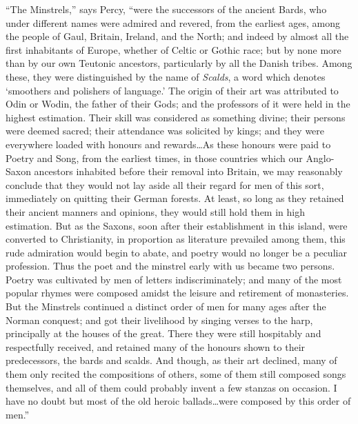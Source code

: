“The Minstrels,” says Percy, “were the successors of the ancient Bards, who
under different names were admired and revered, from the earliest ages, among
the people of Gaul, Britain, Ireland, and the North; and indeed by almost all
the first inhabitants of Europe, whether of Celtic or Gothic race; but by none
more than by our own Teutonic ancestors, particularly by all the Danish tribes.
Among these, they were distinguished by the name of \textit{Scalds}, a word which
denotes ‘smoothers and polishers of language.’ The origin of their art was
attributed to Odin or Wodin, the father of their Gods; and the professors of it
were held in the highest estimation. Their skill was considered as something
divine; their persons were deemed sacred; their attendance was solicited by kings;
and they were everywhere loaded with honours and rewards\ldots As these
honours were paid to Poetry and Song, from the earliest times, in those countries
which our Anglo-Saxon ancestors inhabited before their removal into Britain, we
may reasonably conclude that they would not lay aside all their regard for men
of this sort, immediately on quitting their German forests. At least, so long as
they retained their ancient manners and opinions, they would still hold them in
high estimation. But as the Saxons, soon after their establishment in this
island, were converted to Christianity, in proportion as literature prevailed among 
them, this rude admiration would begin to
\pagebreak
abate, and poetry would no longer be a
peculiar profession. Thus the poet and the minstrel early with us became two 
persons. Poetry was cultivated by men of letters indiscriminately; and many of
the most popular rhymes were composed amidst the leisure and retirement of
monasteries. But the Minstrels continued a distinct order of men for many ages
after the Norman conquest; and got their livelihood by singing verses to the
harp, principally at the houses of the great. There they were still hospitably
and respectfully received, and retained many of the honours shown to their predecessors, 
the bards and scalds. And though, as their art declined, many of
them only recited the compositions of others, some of them still composed songs
themselves, and all of them could probably invent a few stanzas on occasion.
I have no doubt but most of the old heroic ballads\ldots were composed by this
order of men.”

